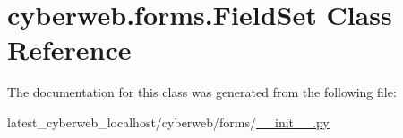 \hypertarget{classcyberweb_1_1forms_1_1_field_set}{\section{cyberweb.\-forms.\-Field\-Set \-Class \-Reference}
\label{classcyberweb_1_1forms_1_1_field_set}
}


\-The documentation for this class was generated from the following file\-:\begin{DoxyCompactItemize}
\item 
latest\-\_\-cyberweb\-\_\-localhost/cyberweb/forms/\hyperlink{forms_2____init_____8py}{\-\_\-\-\_\-init\-\_\-\-\_\-.\-py}\end{DoxyCompactItemize}
